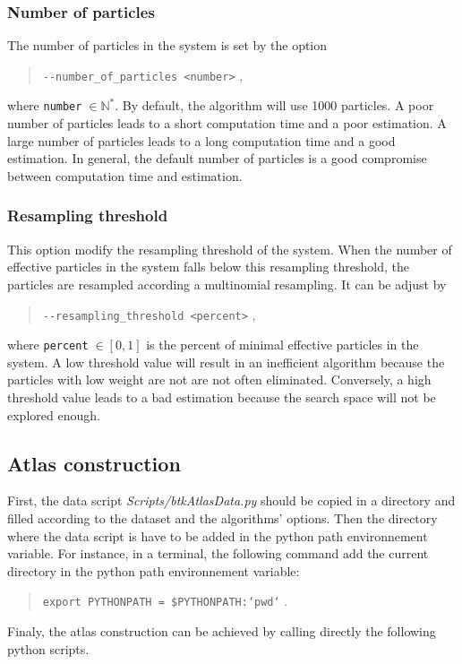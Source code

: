     \subsubsection*{Number of particles}
        The number of particles in the system is set by the option
            \begin{quote}
                \texttt{-\hspace{0.1mm}-number\_of\_particles <number>} \enspace ,
            \end{quote}
        where \texttt{number}$\;\in\mathbb{N}^*$. By default, the algorithm will
        use 1000 particles. A poor number of particles leads to a short
computation time and a poor estimation. A large number of particles leads to a
long computation time and a good estimation. In general, the default number of
particles is a good compromise between computation time and estimation.


    \subsubsection*{Resampling threshold}
        This option modify the resampling threshold of the system. When the
number of effective particles in the system falls below this resampling
threshold, the particles are resampled according a multinomial resampling. It
can be adjust by
            \begin{quote}
                \texttt{-\hspace{0.1mm}-resampling\_threshold <percent>} \enspace ,
            \end{quote}
        where \texttt{percent}$\;\in[0,1]$ is the percent of minimal effective 
        particles in the system. A low threshold value will result in an
inefficient algorithm because the particles with low weight are not are not
often eliminated. Conversely, a high threshold value leads to a bad estimation
because the search space will not be explored enough.


\subsection{Atlas construction}
\label{subsec:atlas}

    First, the data script \emph{Scripts/btkAtlasData.py} should be copied in a directory and filled according to the dataset and the algorithms' options. Then the directory where the data script is have to be added in the python path environnement variable. For instance, in a terminal, the following command add the current directory in the python path environnement variable:
        \begin{quote}
            \texttt{export PYTHONPATH = \$PYTHONPATH:`pwd`} \enspace .
        \end{quote}
    Finaly, the atlas construction can be achieved by calling directly the following python scripts.

